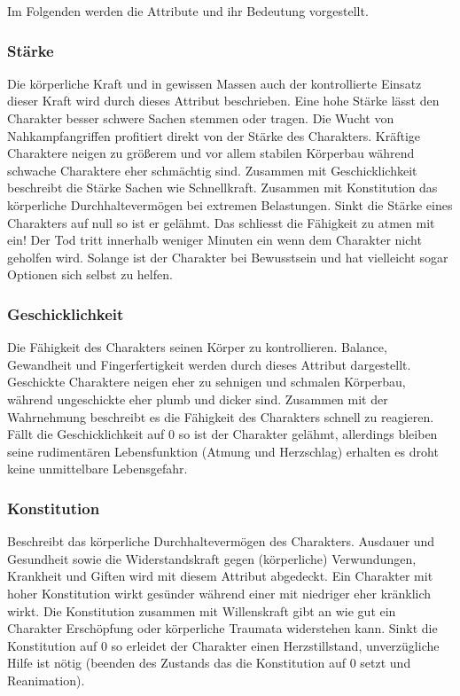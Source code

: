 \documentclass{article}
\begin{document}
Im Folgenden werden die Attribute und ihr Bedeutung vorgestellt. 

\subsubsection{Stärke}

Die körperliche Kraft und in gewissen Massen auch der kontrollierte Einsatz dieser Kraft wird durch dieses Attribut
beschrieben. Eine hohe Stärke lässt den Charakter besser schwere Sachen stemmen oder tragen. Die Wucht von
Nahkampfangriffen profitiert direkt von der Stärke des Charakters. Kräftige Charaktere neigen zu größerem und vor
allem stabilen Körperbau während schwache Charaktere eher schmächtig sind. Zusammen mit Geschicklichkeit beschreibt
die Stärke Sachen wie Schnellkraft. Zusammen mit Konstitution das körperliche Durchhaltevermögen bei extremen
Belastungen. Sinkt die Stärke eines Charakters auf null so ist er gelähmt. Das schliesst die Fähigkeit zu atmen mit
ein! Der Tod tritt innerhalb weniger Minuten ein wenn dem Charakter nicht geholfen wird. Solange ist der Charakter
bei Bewusstsein und hat vielleicht sogar Optionen sich selbst zu helfen.

\subsubsection{Geschicklichkeit}

Die Fähigkeit des Charakters seinen Körper zu kontrollieren. Balance, Gewandheit und Fingerfertigkeit werden durch
dieses Attribut dargestellt. Geschickte Charaktere neigen eher zu sehnigen und schmalen Körperbau, während
ungeschickte eher plumb und dicker sind. Zusammen mit der Wahrnehmung beschreibt es die Fähigkeit des Charakters
schnell zu reagieren. Fällt die Geschicklichkeit auf 0 so ist der Charakter gelähmt, allerdings bleiben seine
rudimentären Lebensfunktion (Atmung und Herzschlag) erhalten es droht keine unmittelbare Lebensgefahr.

\subsubsection{Konstitution}

Beschreibt das körperliche Durchhaltevermögen des Charakters. Ausdauer und Gesundheit sowie die Widerstandskraft gegen
(körperliche) Verwundungen, Krankheit und Giften wird mit diesem Attribut abgedeckt. Ein Charakter mit hoher
Konstitution wirkt gesünder während einer mit niedriger eher kränklich wirkt. Die Konstitution zusammen mit
Willenskraft gibt an wie gut ein Charakter Erschöpfung oder körperliche Traumata widerstehen kann. Sinkt die
Konstitution auf 0 so erleidet der Charakter einen Herzstillstand, unverzügliche Hilfe ist nötig (beenden des Zustands
das die Konstitution auf 0 setzt und Reanimation).
\end{document}
